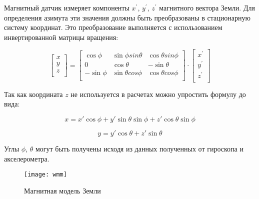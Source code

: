 Магнитный датчик измеряет компоненты $x^{'}$, $y^{'}$, $z^{'}$  магнитного вектора Земли. 
Для определения азимута эти значения должны быть преобразованы в стационарную систему координат.
Это преобразование выполняется с использованием инвертированной матрицы вращения:

\begin{equation}
    \label{eq:domain:invMagnetTilt}
    \begin{bmatrix} x \\ y \\ z \\ \end{bmatrix} = 
    \begin{bmatrix} \cos{\phi} & \sin{\phi}sin{\theta} & \cos{\theta}sin{\phi} \\ 
        0 & \cos{\theta} & -\sin{\theta} \\ 
        -\sin{\phi} & \sin{\theta}cos{\phi}& \cos{\theta}cos{\phi} \\ 
    \end{bmatrix}
    \cdot
    \begin{bmatrix} x^{'} \\ y^{'} \\ z^{'} \\ \end{bmatrix}
    \end{equation} 

Так как координата $z$ не используется в расчетах можно упростить формулу до вида:

\begin{equation}
    \label{eq:domain:xMagnetTilt}
    x = x'\cos{\phi}+y'\sin{\theta}\sin{\phi}+z'\cos{\theta}\sin{\phi}
    \end{equation} 

\begin{equation}
    \label{eq:domain:yMagnetTilt}
    y = y'\cos{\theta}+z'\sin{\theta}
    \end{equation} 

Углы $\phi$, $\theta$ могут быть получены исходя из данных полученных от гироскопа и акселерометра.

\begin{figure}[ht]
    \centering
    \texttt{[image: wmm]}
    \caption{Магнитная модель Земли \cite{magnet_declination}}
    \label{pic:domain:wmm}
\end{figure}

